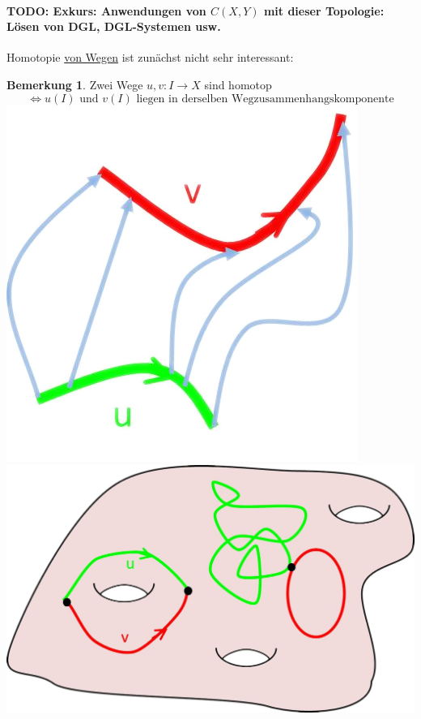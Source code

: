 \documentclass[a4paper,11pt,notitlepage]{report}
\theoremstyle{definition}
\newtheorem{remark}{Bemerkung}[chapter]
\begin{document}
\paragraph{TODO: Exkurs: Anwendungen von $C(X,Y)$ mit dieser Topologie: Lösen von DGL, DGL-Systemen usw.}

Homotopie \underline{von Wegen} ist zunächst nicht sehr interessant:

\begin{remark}{}
	Zwei Wege $u,v \colon I \rightarrow X$ sind homotop
	$$\Leftrightarrow u(I) \text{ und } v(I) \text{ liegen in derselben Wegzusammenhangskomponente}$$
	\includegraphics[scale=0.5]{images/Homotopie_zwischen_Wegen.png} \includegraphics[scale=0.35]{images/Homotopie_zwischen_Wegen2.png}
\end{remark}
\end{document}
